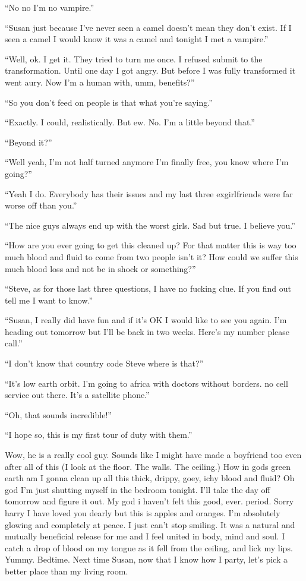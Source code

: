 ``No no I'm no vampire.''

``Susan just because I've never seen a camel doesn't mean they don't exist. If I seen a camel I would know it was a camel and tonight I met a vampire.''

``Well, ok. I get it. They tried to turn me once. I refused submit to the transformation. Until one day I got angry. But before I was fully transformed it went aury. Now I'm a human with, umm, benefits?''

``So you don't feed on people is that what you're saying.''

``Exactly. I could, realistically. But ew. No. I'm a little beyond that.''

``Beyond it?''

``Well yeah, I'm not half turned anymore I'm finally free, you know where I'm going?''

``Yeah I do. Everybody has their issues and my last three exgirlfriends were far worse off than you.''

``The nice guys always end up with the worst girls. Sad but true. I believe you.''

``How are you ever going to get this cleaned up? For that matter this is way too much blood and fluid to come from two people isn't it? How could we suffer this much blood loss and not be in shock or something?''

``Steve, as for those last three questions, I have no fucking clue. If you find out tell me I want to know.''

``Susan, I really did have fun and if it's OK I would like to see you again. I'm heading out tomorrow but I'll be back in two weeks. Here's my number please call.''

``I don't know that country code Steve where is that?''

``It's low earth orbit. I'm going to africa with doctors without borders. no cell service out there. It's a satellite phone.''

``Oh, that sounds incredible!''

``I hope so, this is my first tour of duty with them.''

Wow, he is a really cool guy. Sounds like I might have made a boyfriend too even after all of this (I look at the floor. The walls. The ceiling.) How in gods green earth am I gonna clean up all this thick, drippy, goey, ichy blood and fluid? Oh god I'm just shutting myself in the bedroom tonight. I'll take the day off tomorrow and figure it out. My god i haven't felt this good, ever. period. Sorry harry I have loved you dearly but this is apples and oranges. I'm absolutely glowing and completely at peace. I just can't stop smiling. It was a natural and mutually beneficial release for me and I feel united in body, mind and soul. I catch a drop of blood on my tongue as it fell from the ceiling, and lick my lips. Yummy. Bedtime. Next time Susan, now that I know how I party, let's pick a better place than my living room.\\

